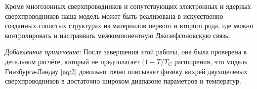 Кроме многозонных сверхпроводников и сопутствующих электронных и ядерных 
сверхпроводников наша модель может быть реализована в искусственно созданных 
слоистых структурах из материалов первого и второго рода, где можно 
контролировать и настраивать межкомпонентную Джозефсоновскую связь.

\emph{Добавленное примечение:} После завершения этой работы, она была 
проверена в детальном расчёте, который не предполагает \( (1-T/T_C \) 
расширения, что модель Гинзбурга-Ландау \eqref{eq:2} довольно точно описывает 
физику вихрей двухщелевых сверхпроводников в достаточно широком диапазоне 
параметров и температур\cite{bib:25}.